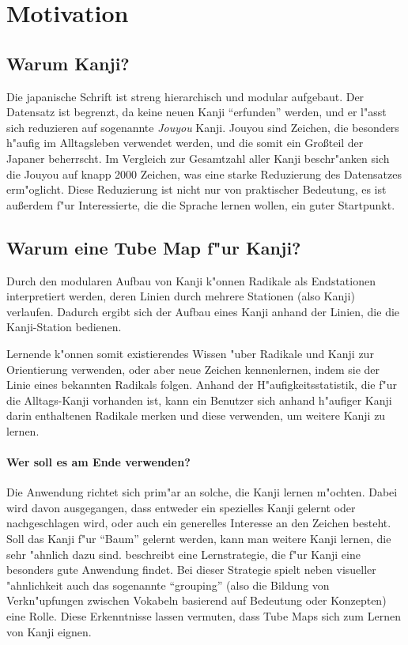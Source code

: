 \section{Motivation}
\subsection{Warum Kanji?}
Die japanische Schrift ist streng hierarchisch und modular aufgebaut. Der Datensatz ist begrenzt, da keine neuen Kanji "`erfunden"' werden, und er l"asst sich reduzieren auf sogenannte \emph{Jouyou} Kanji. Jouyou sind Zeichen, die besonders h"aufig im Alltagsleben verwendet werden, und die somit ein Gro\ss teil der Japaner beherrscht. Im Vergleich zur Gesamtzahl aller Kanji beschr"anken sich die Jouyou auf knapp 2000 Zeichen, was eine starke Reduzierung des Datensatzes erm"oglicht.
Diese Reduzierung ist nicht nur von praktischer Bedeutung, es ist au\ss erdem f"ur Interessierte, die die Sprache lernen wollen, ein guter Startpunkt. 

\subsection{Warum eine Tube Map f"ur Kanji?}
Durch den modularen Aufbau von Kanji k"onnen Radikale als Endstationen interpretiert werden, deren Linien durch mehrere Stationen (also Kanji) verlaufen. Dadurch ergibt sich der Aufbau eines Kanji anhand der Linien, die die Kanji-Station bedienen. 

Lernende k"onnen somit existierendes Wissen "uber Radikale und Kanji zur Orientierung verwenden, oder aber neue Zeichen kennenlernen, indem sie der Linie eines bekannten Radikals folgen. Anhand der H"aufigkeitsstatistik, die f"ur die Alltags-Kanji vorhanden ist, kann ein Benutzer sich anhand h"aufiger Kanji darin enthaltenen Radikale merken und diese verwenden, um weitere Kanji zu lernen. 
\paragraph{Wer soll es am Ende verwenden?}
Die Anwendung richtet sich prim"ar an solche, die Kanji lernen m"ochten. Dabei wird davon ausgegangen, dass entweder ein spezielles Kanji gelernt oder nachgeschlagen wird, oder auch ein generelles Interesse an den Zeichen besteht. Soll das Kanji f"ur "`Baum"' gelernt werden, kann man weitere Kanji lernen, die sehr "ahnlich dazu sind.  
\cite{kanjilearningjapanese10} beschreibt eine Lernstrategie, die f"ur Kanji eine besonders gute Anwendung findet. Bei dieser Strategie spielt neben visueller "ahnlichkeit auch das sogenannte "`grouping"' (also die Bildung von Verkn"upfungen zwischen Vokabeln basierend auf Bedeutung oder Konzepten) eine Rolle. Diese Erkenntnisse lassen vermuten, dass Tube Maps sich zum Lernen von Kanji eignen.
